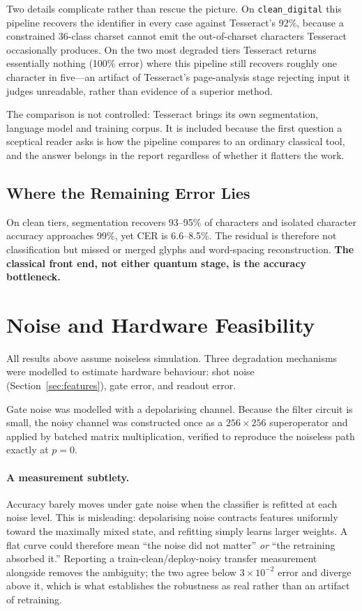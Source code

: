\documentclass[11pt,a4paper]{article}
\begin{document}
Two details complicate rather than rescue the picture. On \texttt{clean\_digital}
this pipeline recovers the identifier in every case against Tesseract's 92\%,
because a constrained 36-class charset cannot emit the out-of-charset characters
Tesseract occasionally produces. On the two most degraded tiers Tesseract returns
essentially nothing (100\% error) where this pipeline still recovers roughly one
character in five---an artifact of Tesseract's page-analysis stage rejecting
input it judges unreadable, rather than evidence of a superior method.

The comparison is not controlled: Tesseract brings its own segmentation, language
model and training corpus. It is included because the first question a sceptical
reader asks is how the pipeline compares to an ordinary classical tool, and the
answer belongs in the report regardless of whether it flatters the work.

\subsection{Where the Remaining Error Lies}

On clean tiers, segmentation recovers 93--95\% of characters and isolated
character accuracy approaches 99\%, yet CER is 6.6--8.5\%. The residual is
therefore not classification but missed or merged glyphs and word-spacing
reconstruction. \textbf{The classical front end, not either quantum stage,
is the accuracy bottleneck.}

\section{Noise and Hardware Feasibility}

All results above assume noiseless simulation. Three degradation mechanisms were
modelled to estimate hardware behaviour: shot noise (Section~\ref{sec:features}),
gate error, and readout error.

Gate noise was modelled with a depolarising channel. Because the filter circuit
is small, the noisy channel was constructed once as a $256\times256$
superoperator and applied by batched matrix multiplication, verified to reproduce
the noiseless path exactly at $p=0$.

\paragraph{A measurement subtlety.} Accuracy barely moves under gate noise when
the classifier is refitted at each noise level. This is misleading: depolarising
noise contracts features uniformly toward the maximally mixed state, and
refitting simply learns larger weights. A flat curve could therefore mean ``the
noise did not matter'' \emph{or} ``the retraining absorbed it.'' Reporting a
train-clean/deploy-noisy transfer measurement alongside removes the ambiguity;
the two agree below $3\times10^{-2}$ error and diverge above it, which is what
establishes the robustness as real rather than an artifact of retraining.
\end{document}
